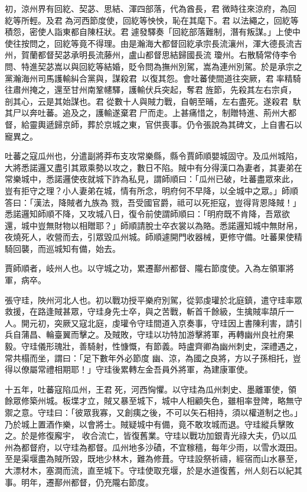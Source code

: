 \begin{pinyinscope}
 初，涼州界有回紇、契苾、思結、渾四部落，代為酋長，君微時往來涼府，為回紇等所輕。及君為河西節度使，回紇等怏怏，恥在其麾下。君以法繩之，回紇等積怨，密使人詣東都自陳枉狀。君遽發驛奏「回紇部落難制，潛有叛謀。」上使中使往按問之，回紇等竟不得理。由是瀚海大都督回紇承宗長流瀼州，渾大德長流吉州，賀蘭都督契苾承明長流藤州，盧山都督思結歸國長流
 瓊州。右散騎常侍李令問、特進契苾嵩以與回紇等結婚，貶令問為撫州別駕，嵩為連州別駕。於是承宗之黨瀚海州司馬護輸糾合黨與，謀殺君，以復其怨。會吐蕃使間道往突厥，君率精騎往肅州掩之，還至甘州南鞏幰驛，護輸伏兵突起，奪君旌節，先殺其左右宗貞，剖其心，云是其始謀也。君從數十人與賊力戰，自朝至晡，左右盡死。遂殺君，馱其尸以奔吐蕃。追及之，護輸遂棄君尸而走。上甚痛惜之，制贈特進、荊州大都
 督，給靈輿遞歸京師，葬於京城之東，官供喪事。仍令張說為其碑文，上自書石以寵異之。



 吐蕃之寇瓜州也，分遣副將莽布支攻常樂縣，縣令賈師順嬰城固守。及瓜州城陷，大將悉諾邏又盡引其眾乘勢以攻之，數日不陷。賊中有分得漢口為妻者，其妻弟在常樂城中，悉諾邏使夜就城下詐為私見，謂師順曰：「瓜州已破，吐蕃盡眾來此，豈有拒守之理？小人妻弟在城，情有所念，明府何不早降，以全城中之眾。」師順答曰：「漢法，降賊者九族為
 戮，吾受國官爵，祗可以死拒寇，豈得背恩降賊！」悉諾邏知師順不降，又攻城八日，復令前使謂師順曰：「明府既不肯降，吾眾欲還，城中豈無財物以相贈耶？」師順請脫士卒衣裳以為賂。悉諾邏知城中無財帛，夜燒死人，收營而去，引眾毀瓜州城。師順遽開門收器械，更修守備。吐蕃果使精騎回襲，而巡城知有備，始去。



 賈師順者，岐州人也。以守城之功，累遷鄯州都督、隴右節度使。入為左領軍將軍，病卒。



 張守珪，陜州河北人也。初以戰功授平樂府別駕，從郭虔瓘於北庭鎮，遣守珪率眾救援，在路逢賊甚眾，守珪身先士卒，與之苦戰，斬首千餘級，生擒賊率頡斤一人。開元初，突厥又寇北庭，虔瓘令守珪間道入京奏事，守珪因上書陳利害，請引兵自蒲昌、輪臺翼而擊之。及賊敗，守珪以功特加游擊將軍，再轉幽州良社府果毅。守珪儀形瑰壯，善騎射，性慷慨，有節義。時盧齊卿為幽州刺史，深禮遇之，常共榻而坐，謂曰：「足下數年外必節度
 幽、涼，為國之良將，方以子孫相托，豈得以僚屬常禮相期耶！」守珪後累轉左金吾員外將軍，為建康軍使。



 十五年，吐蕃寇陷瓜州，王君死，河西恟懼。以守珪為瓜州刺史、墨離軍使，領餘眾修築州城。板堞才立，賊又暴至城下，城中人相顧失色，雖相率登陴，略無守禦之意。守珪曰：「彼眾我寡，又創痍之後，不可以矢石相持，須以權道制之也。」乃於城上置酒作樂，以會將士。賊疑城中有備，竟不敢攻城而退。守珪縱兵擊敗之。於是修復廨宇，
 收合流亡，皆復舊業。守珪以戰功加銀青光祿大夫，仍以瓜州為都督府，以守珪為都督。瓜州地多沙磧，不宜稼穡，每年少雨，以雪水溉田。至是渠堰盡為賊所毀，既地少林木，難為修葺。守珪設祭祈禱，經宿而山水暴至，大漂材木，塞澗而流，直至城下。守珪使取充堰，於是水道復舊，州人刻石以紀其事。明年，遷鄯州都督，仍充隴右節度。




\end{pinyinscope}
